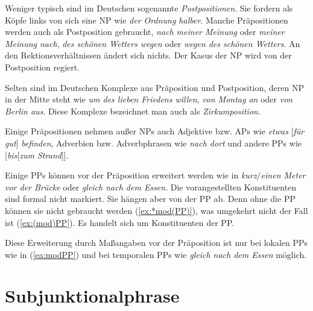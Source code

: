 Weniger typisch sind im Deutschen sogenannte \textit{Postpositionen}. Sie fordern als Köpfe links von sich eine NP wie \textit{der Ordnung halber}. Manche Präpositionen werden auch als Postposition gebraucht, \zB \textit{nach meiner Meinung} oder \textit{meiner Meinung nach}, \textit{des schönen Wetters wegen} oder \textit{wegen des schönen Wetters}. An den Rektionsverhältnissen ändert sich nichts. Der Kasus der NP wird von der Postposition regiert.

Selten sind im Deutschen Komplexe aus Präposition und Postposition, deren NP in der Mitte steht wie \textit{um des lieben Friedens willen}, \textit{von Montag an} oder \textit{von Berlin aus}. Diese Komplexe bezeichnet man auch als \textit{Zirkumposition}.  


Einige Präpositionen nehmen außer NPs auch Adjektive bzw. APs wie \textit{etwas} [\textit{für gut}] \textit{befinden}, Adverbien bzw. Adverbphrasen wie \textit{nach dort} und andere PPs wie [\textit{bis}[\textit{zum Strand}]]. 


Einige PPs können vor der Präposition erweitert werden wie in \textit{kurz}/\textit{einen Meter vor der Brücke} oder \textit{gleich nach dem Essen}. Die vorangestellten Konstituenten sind formal nicht markiert. Sie hängen aber von der PP ab. Denn ohne die PP können sie nicht gebraucht werden (\ref{ex:*mod(PP)}), was umgekehrt nicht der Fall ist (\ref{ex:(mod)PP}). Es handelt sich um Konstituenten der PP.

\ea \label{ea:ModifPP}
\label{ea:modPP}
\label{ex:*mod(PP)}
\label{ex:(mod)PP}
\z 
\z 

Diese Erweiterung durch Maßangaben vor der Präposition ist nur bei lokalen PPs wie in (\ref{ea:modPP}) und bei temporalen PPs wie \textit{gleich nach dem Essen} möglich. 


\section{Subjunktionalphrase}\label{section:SubjunktP}

